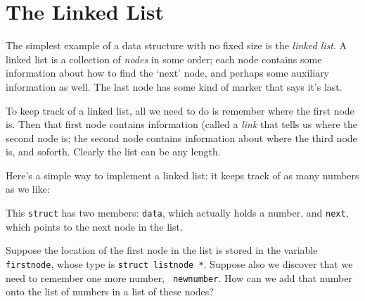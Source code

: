 \section{The Linked List}

The simplest example of a data structure with no fixed size is the {\em
linked list}\/.  A linked list is a collection of {\em nodes} in some
order; each node contains some information about how to find the `next'
node, and perhaps some auxiliary information as well.  The last node has
some kind of marker that says it's last.  

To keep track of a linked list, all we need to do is remember where the
first node is.  Then that first node contains information (called a {\em
link}\/ that tells us where the second node is; the second node contains
information about where the third node is, and soforth. Clearly the list
can be any length.  

Here's a simple way to implement a linked list: it keeps track of as
many numbers as we like:

\begin{flushleft}
\verb% struct listnode {% \\*
\verb%   int data; % \\*
\verb%   struct listnode *next; % \\*
\verb%} ; % 
\end{flushleft}

This {\tt struct} has two members:  {\tt data}, which actually holds a
number, and {\tt next}, which points to the next node in the list.  

Suppose the location of the first node in the list is stored in the
variable {\tt firstnode}, whose type is {\tt struct listnode *}.
Suppose also we discover that we need to remember one more number, {\tt
newnumber}.  How can we add that number onto the list of numbers in a
list of these nodes?

\begin{flushleft}
\verb% struct listnode *temp;% \\* 
\verb% % \\* 
\verb% temp = malloc(sizeof(struct listnode));% \\* 
\verb% % \\* 
\verb% (*temp).next = firstnode;% \\* 
\verb% (*temp).data = newnumber;% \\* 
\verb% firstnode = temp;% \\* 
\end{flushleft}


